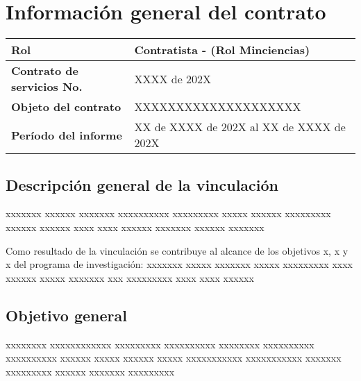 \documentclass[10pt,table,xcdraw]{article}
\begin{document}
	
	\tableofcontents 
	\newpage
	
	\section{Información general del contrato}
	\begin{table}[H]
		\centering
		\begin{tabular}{>{\arraybackslash}m{8cm} >{\arraybackslash}m{6.5cm}}
			\toprule
			\textbf{Rol} & \vspace{2mm}Contratista - (Rol Minciencias)\vspace{2mm}\\\hline
			\vspace{2mm}
			\textbf{Contrato de servicios No.}\vspace{2mm} & \vspace{2mm} XXXX de 202X\vspace{2mm}\\\hline
			\vspace{2mm}
			\textbf{Objeto del contrato} \vspace{2mm} & \vspace{2mm} XXXXXXXXXXXXXXXXXXXX\vspace{2mm}\\\hline
			\textbf{Período del informe} & \vspace{2mm} XX de XXXX de 202X al XX de XXXX de 202X\vspace{2mm}\\\hline
		\end{tabular}
	\end{table}
	
	\subsection{Descripción general de la vinculación}
	xxxxxxx xxxxxx xxxxxxx xxxxxxxxxx xxxxxxxxx xxxxx xxxxxx xxxxxxxxx xxxxxx xxxxxx xxxx xxxx xxxxxx xxxxxxx xxxxxx xxxxxxx
	
	Como resultado de la vinculación se contribuye al alcance de los objetivos x, x y x del programa de investigación: xxxxxxx xxxxx xxxxxxx xxxxx xxxxxxxxx xxxx xxxxxx xxxxx xxxxxxx xxx xxxxxxxxx xxxx xxxx xxxxxx
	
	\subsection{Objetivo general}
	xxxxxxxx xxxxxxxxxxxx xxxxxxxxx xxxxxxxxxx xxxxxxxx xxxxxxxxxx xxxxxxxxxx xxxxxx xxxxx xxxxxx xxxxx xxxxxxxxxxx xxxxxxxxxxx xxxxxxx xxxxxxxxx xxxxxx xxxxxxx xxxxxxxxx
	
\end{document}
